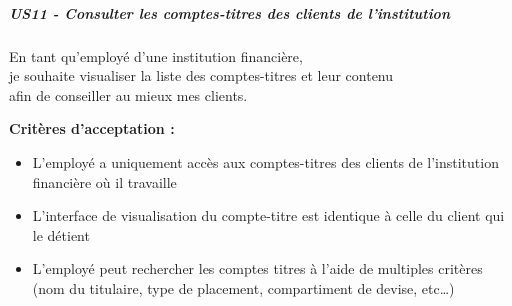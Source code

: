 \subparagraph{US11 - Consulter les comptes-titres des clients de
l'institution}\label{us11---consulter-les-comptes-titres-des-clients-de-linstitution}

En tant qu'employé d'une institution financière,\\
je souhaite visualiser la liste des comptes-titres et leur contenu\\
afin de conseiller au mieux mes clients.

\textbf{Critères d'acceptation :}

\begin{itemize}
\tightlist
\item
  L'employé a uniquement accès aux comptes-titres des clients de
  l'institution financière où il travaille
\item
  L'interface de visualisation du compte-titre est identique à celle du
  client qui le détient
\item
  L'employé peut rechercher les comptes titres à l'aide de multiples
  critères (nom du titulaire, type de placement, compartiment de devise,
  etc\ldots)
\end{itemize}
